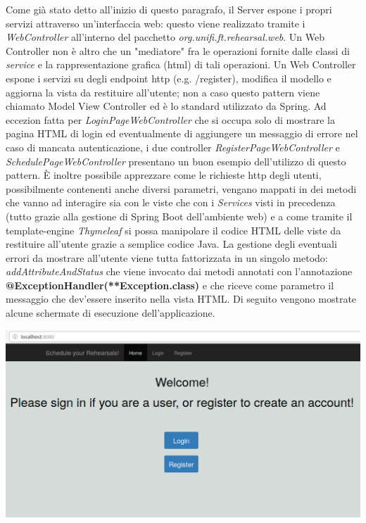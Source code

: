 Come già stato detto all'inizio di questo paragrafo, il Server espone i propri servizi attraverso un'interfaccia web: questo viene realizzato tramite i \textsl{WebController} all'interno del pacchetto \textsl{org.unifi.ft.rehearsal.web}.\newline\newline
Un Web Controller non è altro che un "mediatore" fra le operazioni fornite dalle classi di \textsl{service} e la rappresentazione grafica (html) di tali operazioni. Un Web Controller espone i servizi su degli endpoint http (e.g. /register), modifica il modello e aggiorna la vista da restituire all'utente; non a caso questo pattern viene chiamato Model View Controller ed è lo standard utilizzato da Spring.\newline
Ad eccezion fatta per \textsl{LoginPageWebController} che si occupa solo di mostrare la pagina HTML di login ed eventualmente di aggiungere un messaggio di errore nel caso di mancata autenticazione, i due controller \textsl{RegisterPageWebController} e \textsl{SchedulePageWebController} presentano un buon esempio dell'utilizzo di questo pattern. È inoltre possibile apprezzare come le richieste http degli utenti, possibilmente contenenti anche diversi parametri, vengano mappati in dei metodi che vanno ad interagire sia con le viste che con i \textsl{Services} visti in precedenza (tutto grazie alla gestione di Spring Boot dell'ambiente web) e a come tramite il template-engine \textsl{Thymeleaf} si possa manipolare il codice HTML delle viste da restituire all'utente grazie a semplice codice Java.\newline
La gestione degli eventuali errori da mostrare all'utente viene tutta fattorizzata in un singolo metodo: \textsl{addAttributeAndStatus} che viene invocato dai metodi annotati con l'annotazione \textbf{@ExceptionHandler(**Exception.class)} e che riceve come parametro il messaggio che dev'essere inserito nella vista HTML.\newline\newline
Di seguito vengono mostrate alcune schermate di esecuzione dell'applicazione.

\begin{minipage}{\linewidth}
	\includegraphics[width=\textwidth]{img/homepage.png}
\end{minipage}

